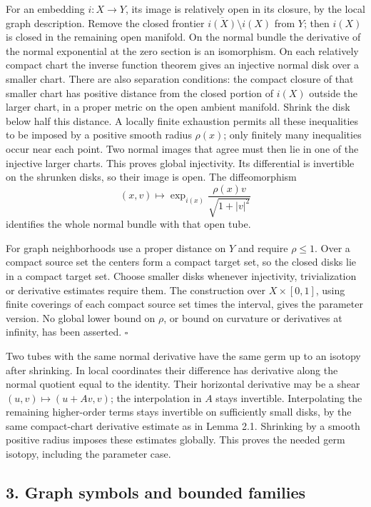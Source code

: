 \documentclass[
  11pt,
]{article}
\begin{document}
For an embedding \(i:X\to Y\), its image is relatively open in its
closure, by the local graph description. Remove the closed frontier
\(\overline{i(X)}\setminus i(X)\) from \(Y\); then \(i(X)\) is closed in
the remaining open manifold. On the normal bundle the derivative of the
normal exponential at the zero section is an isomorphism. On each
relatively compact chart the inverse function theorem gives an injective
normal disk over a smaller chart. There are also separation conditions:
the compact closure of that smaller chart has positive distance from the
closed portion of \(i(X)\) outside the larger chart, in a proper metric
on the open ambient manifold. Shrink the disk below half this distance.
A locally finite exhaustion permits all these inequalities to be imposed
by a positive smooth radius \(\rho(x)\); only finitely many inequalities
occur near each point. Two normal images that agree must then lie in one
of the injective larger charts. This proves global injectivity. Its
differential is invertible on the shrunken disks, so their image is
open. The diffeomorphism \[
 (x,v)\longmapsto \exp_{i(x)}\frac{\rho(x)v}{\sqrt{1+|v|^2}}
 \tag{2.1}
\] identifies the whole normal bundle with that open tube.

For graph neighborhoods use a proper distance on \(Y\) and require
\(\rho\leq1\). Over a compact source set the centers form a compact
target set, so the closed disks lie in a compact target set. Choose
smaller disks whenever injectivity, trivialization or derivative
estimates require them. The construction over \(X\times[0,1]\), using
finite coverings of each compact source set times the interval, gives
the parameter version. No global lower bound on \(\rho\), or bound on
curvature or derivatives at infinity, has been asserted. \(\square\)

Two tubes with the same normal derivative have the same germ up to an
isotopy after shrinking. In local coordinates their difference has
derivative along the normal quotient equal to the identity. Their
horizontal derivative may be a shear \((u,v)\mapsto(u+Av,v)\); the
interpolation in \(A\) stays invertible. Interpolating the remaining
higher-order terms stays invertible on sufficiently small disks, by the
same compact-chart derivative estimate as in Lemma 2.1. Shrinking by a
smooth positive radius imposes these estimates globally. This proves the
needed germ isotopy, including the parameter case.

\subsection{3. Graph symbols and bounded
families}\label{graph-symbols-and-bounded-families}
\end{document}
